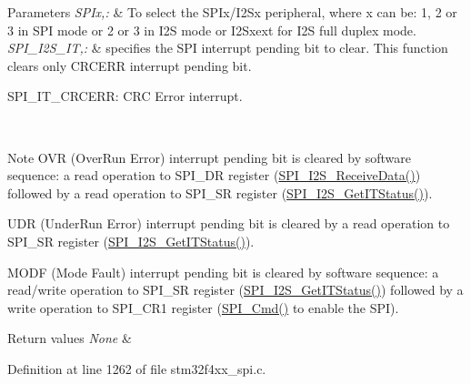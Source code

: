 \begin{DoxyParams}{Parameters}
{\em S\-P\-Ix,\-:} & To select the S\-P\-Ix/\-I2\-Sx peripheral, where x can be\-: 1, 2 or 3 in S\-P\-I mode or 2 or 3 in I2\-S mode or I2\-Sxext for I2\-S full duplex mode. \\
\hline
{\em S\-P\-I\-\_\-\-I2\-S\-\_\-\-I\-T,\-:} & specifies the S\-P\-I interrupt pending bit to clear. This function clears only C\-R\-C\-E\-R\-R interrupt pending bit. \begin{DoxyItemize}
\item S\-P\-I\-\_\-\-I\-T\-\_\-\-C\-R\-C\-E\-R\-R\-: C\-R\-C Error interrupt.\end{DoxyItemize}
\\
\hline
\end{DoxyParams}
\begin{DoxyNote}{Note}
O\-V\-R (Over\-Run Error) interrupt pending bit is cleared by software sequence\-: a read operation to S\-P\-I\-\_\-\-D\-R register (\hyperlink{group___s_p_i___exported___functions_gab77de76547f3bff403236b263b070a30}{S\-P\-I\-\_\-\-I2\-S\-\_\-\-Receive\-Data()}) followed by a read operation to S\-P\-I\-\_\-\-S\-R register (\hyperlink{group___s_p_i___exported___functions_ga72decbc1cd79f8fad92a2204beca6bc5}{S\-P\-I\-\_\-\-I2\-S\-\_\-\-Get\-I\-T\-Status()}). 

U\-D\-R (Under\-Run Error) interrupt pending bit is cleared by a read operation to S\-P\-I\-\_\-\-S\-R register (\hyperlink{group___s_p_i___exported___functions_ga72decbc1cd79f8fad92a2204beca6bc5}{S\-P\-I\-\_\-\-I2\-S\-\_\-\-Get\-I\-T\-Status()}). 

M\-O\-D\-F (Mode Fault) interrupt pending bit is cleared by software sequence\-: a read/write operation to S\-P\-I\-\_\-\-S\-R register (\hyperlink{group___s_p_i___exported___functions_ga72decbc1cd79f8fad92a2204beca6bc5}{S\-P\-I\-\_\-\-I2\-S\-\_\-\-Get\-I\-T\-Status()}) followed by a write operation to S\-P\-I\-\_\-\-C\-R1 register (\hyperlink{group___s_p_i___exported___functions_gaa31357879a65ee1ed7223f3b9114dcf3}{S\-P\-I\-\_\-\-Cmd()} to enable the S\-P\-I). 
\end{DoxyNote}

\begin{DoxyRetVals}{Return values}
{\em None} & \\
\hline
\end{DoxyRetVals}


Definition at line 1262 of file stm32f4xx\-\_\-spi.\-c.

